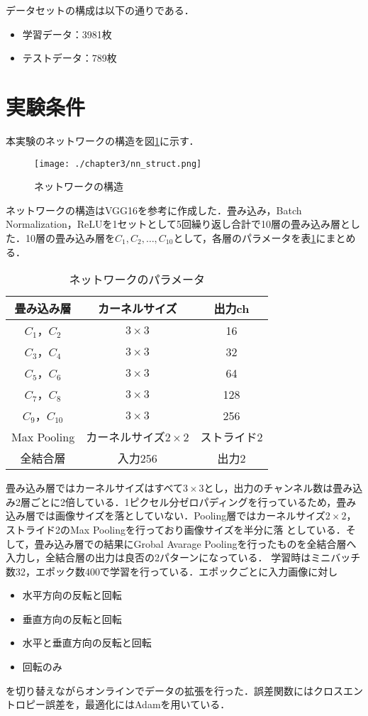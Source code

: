 データセットの構成は以下の通りである．
\begin{itemize}
  \item 学習データ：3981枚
  \item テストデータ：789枚
\end{itemize}

\section{実験条件}
本実験のネットワークの構造を図\ref{fig_nnst}に示す．
\begin{figure}[!b]
  \begin{center}
    \texttt{[image: ./chapter3/nn\_struct.png]}
    \caption{ネットワークの構造}
    \label{fig_nnst}
  \end{center}
\end{figure}
ネットワークの構造はVGG16\cite{simonyan2015deep}を参考に作成した．畳み込み，Batch Normalization，ReLUを1セットとして5回繰り返し合計で10層の畳み込み層とした．10層の畳み込み層を$C_1, C_2,  \ldots , C_{10}$として，各層のパラメータを表\ref{table_network_parameter}にまとめる．
\begin{table}[!t]
  \caption{ネットワークのパラメータ}
  \label{table_network_parameter}
  \centering
  \begin{tabular}{ccc}
    \hline
    畳み込み層  & カーネルサイズ & 出力ch \\
    \hline \hline
    $C_1$，$C_2$ & $3\times 3$ & 16\\
    $C_3$，$C_4$ & $3\times 3$ & 32\\
    $C_5$，$C_6$ & $3\times 3$ & 64\\
    $C_7$，$C_8$ & $3\times 3$ & 128\\
    $C_9$，$C_{10}$ & $3\times 3$ & 256\\
    \hline
    Max Pooling & カーネルサイズ$2\times 2$ & ストライド2\\
    全結合層 & 入力256 & 出力2\\
    \hline
  \end{tabular}
\end{table}
畳み込み層ではカーネルサイズはすべて$3\times 3$とし，出力のチャンネル数は畳み込み2層ごとに2倍している．1ピクセル分ゼロパディングを行っているため，畳み込み層では画像サイズを落としていない．Pooling層ではカーネルサイズ$2\times 2$，ストライド2のMax Poolingを行っており画像サイズを半分に落
としている．そして，畳み込み層での結果にGrobal Avarage Poolingを行ったものを全結合層へ入力し，全結合層の出力は良否の2パターンになっている．
学習時はミニバッチ数32，エポック数400で学習を行っている．エポックごとに入力画像に対し
\begin{itemize}
  \item 水平方向の反転と回転
  \item 垂直方向の反転と回転
  \item 水平と垂直方向の反転と回転
  \item 回転のみ
\end{itemize}
を切り替えながらオンラインでデータの拡張を行った．誤差関数にはクロスエントロピー誤差を，最適化にはAdamを用いている．

